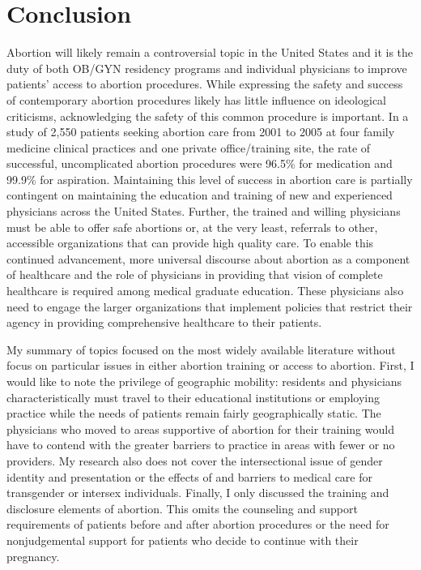 \documentclass[letterpaper, 12pt]{article}
\begin{document}
\section*{Conclusion}

Abortion will likely remain a controversial topic in the United States and it is the duty of both OB/GYN residency programs and individual physicians to improve patients' access to abortion procedures. While expressing the safety and success of contemporary abortion procedures likely has little influence on ideological criticisms, acknowledging the safety of this common procedure is important.
In a study of 2,550 patients seeking abortion care from 2001 to 2005 at four family medicine clinical practices and one private office/training site, the rate of successful, uncomplicated abortion procedures were 96.5\% for medication and 99.9\% for aspiration. \autocite[pg. 527]{bennett_early_2009}
Maintaining this level of success in abortion care is partially contingent on maintaining the education and training of new and experienced physicians across the United States. Further, the trained and willing physicians must be able to offer safe abortions or, at the very least, referrals to other, accessible organizations that can provide high quality care. To enable this continued advancement, more universal discourse about abortion as a component of healthcare and the role of physicians in providing that vision of complete healthcare is required among medical graduate education. These physicians also need to engage the larger organizations that implement policies that restrict their agency in providing comprehensive healthcare to their patients.

My summary of topics focused on the most widely available literature without focus on particular issues in either abortion training or access to abortion. First, I would like to note the privilege of geographic mobility: residents and physicians characteristically must travel to their educational institutions or employing practice while the needs of patients remain fairly geographically static. The physicians who moved to areas supportive of abortion for their training would have to contend with the greater barriers to practice in areas with fewer or no providers. My research also does not cover the intersectional issue of gender identity and presentation or the effects of and barriers to medical care for transgender or intersex individuals. Finally, I only discussed the training and disclosure elements of abortion. This omits the counseling and support requirements of patients before and after abortion procedures or the need for nonjudgemental support for patients who decide to continue with their pregnancy.

\newpage
\printbibliography
\end{document}
